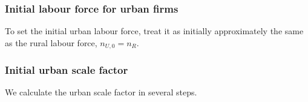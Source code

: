 \documentclass[]{article}
\begin{document}
\subsubsection{Initial labour force for urban firms}
To set the initial urban labour force, treat it as initially approximately the same as the rural labour force,  $n_{U,0}=n_R$. %




\subsubsection{Initial urban scale factor}


We calculate the urban scale factor in several steps.
\end{document}
